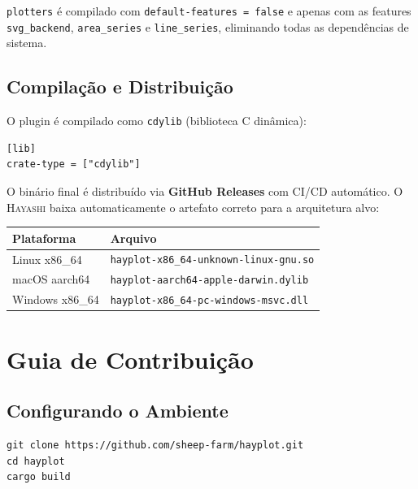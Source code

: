 \documentclass[12pt, a4paper, oneside]{book}
\newcommand{\code}[1]{\texttt{#1}}
\newcommand{\hayashi}{\textsc{Hayashi}}
\begin{document}
\code{plotters} é compilado com \code{default-features = false} e apenas com
as features \code{svg\_backend}, \code{area\_series} e \code{line\_series},
eliminando todas as dependências de sistema.

\section{Compilação e Distribuição}

O plugin é compilado como \code{cdylib} (biblioteca C dinâmica):

\begin{lstlisting}[style=inline, caption={Cargo.toml --- tipo de crate}]
[lib]
crate-type = ["cdylib"]
\end{lstlisting}

O binário final é distribuído via \textbf{GitHub Releases} com CI/CD automático.
O \hayashi{} baixa automaticamente o artefato correto para a arquitetura alvo:

\begin{center}
  \begin{tabular}{@{}ll@{}}
    \toprule
    \textbf{Plataforma}      & \textbf{Arquivo} \\
    \midrule
    Linux x86\_64            & \code{hayplot-x86\_64-unknown-linux-gnu.so} \\
    macOS aarch64            & \code{hayplot-aarch64-apple-darwin.dylib} \\
    Windows x86\_64          & \code{hayplot-x86\_64-pc-windows-msvc.dll} \\
    \bottomrule
  \end{tabular}
\end{center}

\chapter{Guia de Contribuição}

\section{Configurando o Ambiente}

\begin{lstlisting}[style=inline, caption={Clonar e compilar localmente}]
git clone https://github.com/sheep-farm/hayplot.git
cd hayplot
cargo build
\end{lstlisting}
\end{document}
